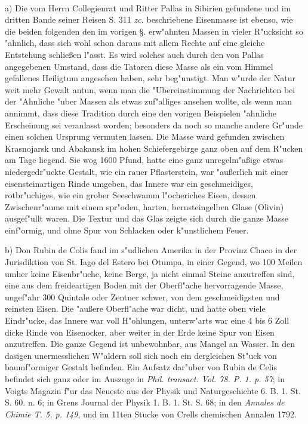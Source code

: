 \documentclass[a4paper, 11pt, oneside, polutonikogreek, german]{article}
\begin{document}
\paragraph{}
a) Die vom Herrn Collegienrat und Ritter Pallas in Sibirien gefundene und im dritten Bande seiner Reisen S. 311 \emph{zc.} beschriebene Eisenmasse ist ebenso, wie die beiden folgenden den im vorigen §. erw"ahnten Massen in vieler R"ucksicht so "ahnlich, dass sich wohl schon daraus mit allem Rechte auf eine gleiche Entstehung schließen l"asst. Es wird solches auch durch den von Pallas angegebenen Umstand, dass die Tataren diese Masse als ein vom Himmel gefallenes Heiligtum angesehen haben, sehr beg"unstigt. Man w"urde der Natur weit mehr Gewalt antun, wenn man die "Ubereinstimmung der Nachrichten bei der "Ahnliche "uber Massen als etwas zuf"alliges ansehen wollte, als wenn man annimmt, dass diese Tradition durch eine den vorigen Beispielen "ahnliche Erscheinung sei veranlasst worden; besonders da noch so manche andere Gr"unde einen solchen Ursprung vermuten lassen. Die Masse ward gefunden zwischen Krasnojarsk und Abakansk im hohen Schiefergebirge ganz oben auf dem R"ucken am Tage liegend. Sie wog 1600 Pfund, hatte eine ganz unregelm"aßige etwas niedergedr"uckte Gestalt, wie ein rauer Pflasterstein, war "außerlich mit einer eisensteinartigen Rinde umgeben, das Innere war ein geschmeidiges, rotbr"uchiges, wie ein grober Seeschwamm l"ocheriches Eisen, dessen Zwischenr"aume mit einem spr"oden, harten, bernsteingelben Glase (Olivin) ausgef"ullt waren. Die Textur und das Glas zeigte sich durch die ganze Masse einf"ormig, und ohne Spur von Schlacken oder k"unstlichem Feuer.

b) Don Rubin de Colis fand im s"udlichen Amerika in der Provinz Chaco in der Jurisdiktion von St. Iago del Estero bei Otumpa, in einer Gegend, wo 100 Meilen umher keine Eisenbr"uche, keine Berge, ja nicht einmal Steine anzutreffen sind, eine aus dem freideartigen Boden mit der Oberfl"ache hervorragende Masse, ungef"ahr 300 Quintale oder Zentner schwer, von dem geschmeidigsten und reinsten Eisen. Die "außere Oberfl"ache war dicht, und hatte oben viele Eindr"ucke, das Innere war voll H"ohlungen, unterw"arts war eine 4 bis 6 Zoll dicke Rinde von Eisenocker, aber weiter in der Erde keine Spur von Eisen anzutreffen. Die ganze Gegend ist unbewohnbar, aus Mangel an Wasser. In den dasigen unermesslichen W"aldern soll sich noch ein dergleichen St"uck von baumf"ormiger Gestalt befinden. Ein Aufsatz dar"uber von Rubin de Celis befindet sich ganz oder im Auszuge in \emph{Phil. transact. Vol. 78. P. 1. p. 57}; in Voigts Magazin f"ur das Neueste aus der Physik und Naturgeschichte 6. B. 1. St. S. 60. n. 6; in Grens Journal der Physik 1. B. 1. St. S. 68; in den \emph{Annales de Chimie T. 5. p. 149}, und im 11ten Stucke von Crells chemischen Annalen 1792.
\end{document}
